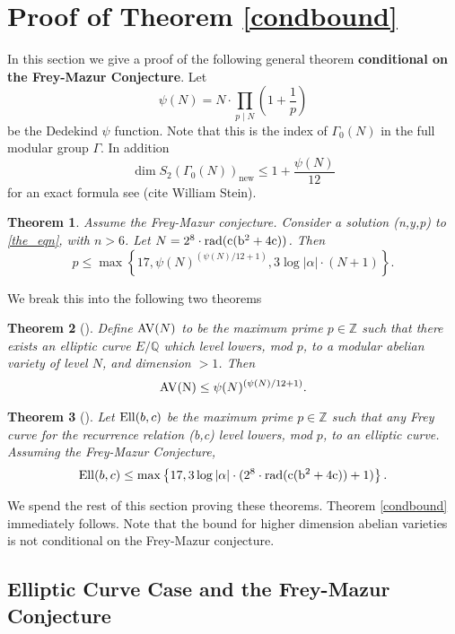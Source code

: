 \documentclass[12pt]{amsart}
\newtheorem{thm}{Theorem}[section]
\theoremstyle{definition}
\def\Q{{\mathbb Q}}
\def\Z{{\mathbb Z}}
\newcommand{\rad}{\rm rad}
\newcommand{\Ell}{\rm{Ell}}
\newcommand{\AV}{\rm{AV}}
\begin{document}
\section{Proof of Theorem \ref{condbound}}\label{genthmproof}

In this section we give a proof of the following general theorem \textbf{conditional on the Frey-Mazur Conjecture}.  Let 
\[\psi(N) = N \cdot \prod_{p \mid N} \left( 1 + \frac{1}{p} \right) \]
be the Dedekind $\psi$ function.  Note that this is the index of $\Gamma_0(N)$ in the full modular group $\Gamma$. In addition 
\[ \dim S_2(\Gamma_0(N))_{\text{new}} \leq 1 + \frac{\psi(N)}{12} \]
for an exact formula see (cite William Stein).

\begin{thm}\label{condbound_inplace}
Assume the Frey-Mazur conjecture.  Consider a solution (n,y,p) to \eqref{the_eqn}, with $n > 6$. Let $N = 2^8 \cdot \rad(c(b^2+4c))$. Then 
\[ p \leq \max\left\{17,   \psi(N)^{(\psi(N)/12 + 1)}, 3\log{|\alpha|} \cdot ( N+1)  \right\}. \]
\end{thm}

We break this into the following two theorems

\begin{thm}[]\label{bound_av}
Define ${\AV}(N)$ to be the maximum prime $p \in \Z$ such that there exists an elliptic curve $E/\Q$ which level lowers, mod $p$, to a modular abelian variety of level $N$, and dimension $> 1$.  Then
\[{\AV(N)} \leq \psi(N)^{(\psi(N)/12+1)}. \]
\end{thm}

\begin{thm}[]\label{bound_ell}
Let ${\Ell}(b,c)$ be the maximum prime $p \in \Z$ such that any Frey curve for the recurrence relation (b,c) level lowers, mod $p$, to an elliptic curve.  Assuming the Frey-Mazur Conjecture, 
\[{\Ell}(b,c) \leq \max\left\{17, 3\log{|\alpha|} \cdot (2^{8} \cdot \rad(c(b^2+4c))+1) \right\}. \]
\end{thm}


We spend the rest of this section proving these theorems. Theorem \ref{condbound} immediately follows.  Note that the bound for higher dimension abelian varieties is not conditional on the Frey-Mazur conjecture.



\subsection{Elliptic Curve Case and the Frey-Mazur Conjecture}
\end{document}
